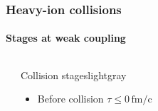 \documentclass[aspectratio=169,11pt,usenames,dvipsnames]{beamer}
\begin{document}
\begin{frame}
    \frametitle{Heavy-ion collisions}
    \framesubtitle{Stages at weak coupling}
    \vspace{-15pt}
    \begin{columns}[onlytextwidth,t]
            \begin{center}
                \vspace{-5pt}
            \end{center}
            \vspace{10pt}
            \begin{center}
            \begin{custombox2}{\color{normal}Collision stages}{lightgray}
                \small
                \begin{varwidth}{0.8\textwidth}
                \begin{itemize}\itemsep0em 
                    \item {Before collision {\scriptsize $\tau\leq 0\,\mathrm{fm/c}$}}\\[1pt]

\end{itemize}
\end{varwidth}
\end{custombox2}
\end{center}
\end{columns}
\end{frame}
\end{document}

